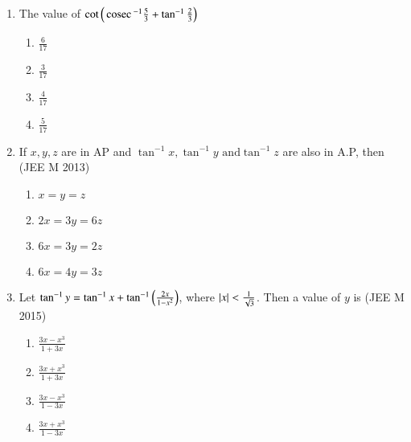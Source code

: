 \documentclass[journal]{IEEEtran}
\begin{document}
\begin{enumerate}
{		\begin{multicols}{4}
		\begin{enumerate}
			\item{$4$}
			\columnbreak
			\item{$5$}
			\columnbreak
			\item{$1$}
			\columnbreak
			\item{$3$}
		\end{enumerate}
		\end{multicols}
	}
	\item{
			The value of $\cot\left(\,\text{cosec}\,^{-1}\frac{5}{3} + \tan^{-1}\frac{2}{3}\right)$
		\begin{multicols}{4}
		\begin{enumerate}
			\item{$\frac{6}{17}$}
			\columnbreak
			\item{$\frac{3}{17}$}
			\columnbreak
			\item{$ \frac{4}{17}$}
			\columnbreak
			\item{$ \frac{5}{17}$}
		\end{enumerate}
		\end{multicols}
	}
	\item{
			If $x,y,z$ are in AP and $\tan^{-1}x, \tan^{-1}y \text{ and} \tan^{-1}z$ are also in A.P, then \hfill (JEE M 2013)
		\begin{multicols}{4}
		\begin{enumerate}
			\item{$x=y=z$}
			\columnbreak
			\item{$2x=3y=6z$}
			\columnbreak
			\item{$6x=3y=2z$}
			\columnbreak
			\item{$6x=4y=3z$}
		\end{enumerate}
		\end{multicols}
	}
	\item{
			Let $\tan^{-1}y = \tan^{-1}x + \tan^{-1}\left(\frac{2x}{1-x^2}\right)$, where $\left\vert x\right\vert < \frac{1}{\sqrt{3}}$. Then a value of $y$ is \hfill (JEE M 2015)
		\begin{multicols}{4}
		\begin{enumerate}
			\item{$\frac{3x - x^3}{1 + 3x}$}
			\columnbreak
			\item{$\frac{3x + x^3}{1 + 3x}$}
			\columnbreak
			\item{$\frac{3x - x^3}{1 - 3x}$}
			\columnbreak
			\item{$\frac{3x + x^3}{1 - 3x}$}
		\end{enumerate}

\end{multicols}}
\end{enumerate}
\end{document}
